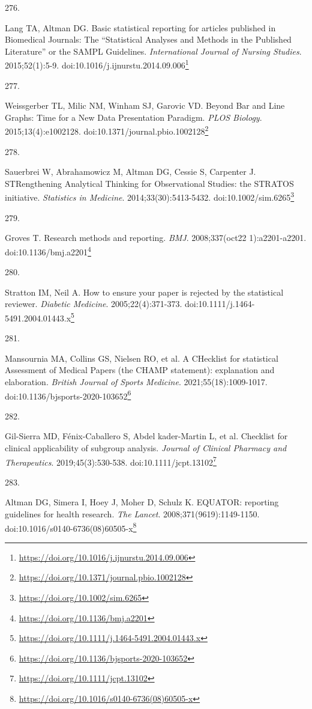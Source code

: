 \documentclass[
  a4paper,
]{book}
\newlength{\cslhangindent}
\newlength{\csllabelwidth}
\newlength{\cslentryspacingunit} %
\newenvironment{CSLReferences}[2] %
 {%
  \setlength{\parindent}{0pt}
  \ifodd #1
  \let\oldpar\par
  \def\par{\hangindent=\cslhangindent\oldpar}
  \fi
  \setlength{\parskip}{#2\cslentryspacingunit}
 }%
 {}
\newcommand{\CSLLeftMargin}[1]{\parbox[t]{\csllabelwidth}{#1}}
\newcommand{\CSLRightInline}[1]{\parbox[t]{\linewidth - \csllabelwidth}{#1}\break}
\renewcommand{\href}[2]{#2\footnote{\url{#1}}}
\begin{document}
\begin{CSLReferences}{0}{0}
\leavevmode{}%
\CSLLeftMargin{276. }%
\CSLRightInline{Lang TA, Altman DG. Basic statistical reporting for articles published in Biomedical Journals: The {``}Statistical Analyses and Methods in the Published Literature{''} or the SAMPL Guidelines. \emph{International Journal of Nursing Studies}. 2015;52(1):5-9. doi:\href{https://doi.org/10.1016/j.ijnurstu.2014.09.006}{10.1016/j.ijnurstu.2014.09.006}}

\leavevmode{}%
\CSLLeftMargin{277. }%
\CSLRightInline{Weissgerber TL, Milic NM, Winham SJ, Garovic VD. Beyond Bar and Line Graphs: Time for a New Data Presentation Paradigm. \emph{PLOS Biology}. 2015;13(4):e1002128. doi:\href{https://doi.org/10.1371/journal.pbio.1002128}{10.1371/journal.pbio.1002128}}

\leavevmode{}%
\CSLLeftMargin{278. }%
\CSLRightInline{Sauerbrei W, Abrahamowicz M, Altman DG, Cessie S, Carpenter J. STRengthening Analytical Thinking for Observational Studies: the STRATOS initiative. \emph{Statistics in Medicine}. 2014;33(30):5413-5432. doi:\href{https://doi.org/10.1002/sim.6265}{10.1002/sim.6265}}

\leavevmode{}%
\CSLLeftMargin{279. }%
\CSLRightInline{Groves T. Research methods and reporting. \emph{BMJ}. 2008;337(oct22 1):a2201-a2201. doi:\href{https://doi.org/10.1136/bmj.a2201}{10.1136/bmj.a2201}}

\leavevmode{}%
\CSLLeftMargin{280. }%
\CSLRightInline{Stratton IM, Neil A. How to ensure your paper is rejected by the statistical reviewer. \emph{Diabetic Medicine}. 2005;22(4):371-373. doi:\href{https://doi.org/10.1111/j.1464-5491.2004.01443.x}{10.1111/j.1464-5491.2004.01443.x}}

\leavevmode{}%
\CSLLeftMargin{281. }%
\CSLRightInline{Mansournia MA, Collins GS, Nielsen RO, et al. A CHecklist for statistical Assessment of Medical Papers (the CHAMP statement): explanation and elaboration. \emph{British Journal of Sports Medicine}. 2021;55(18):1009-1017. doi:\href{https://doi.org/10.1136/bjsports-2020-103652}{10.1136/bjsports-2020-103652}}

\leavevmode{}%
\CSLLeftMargin{282. }%
\CSLRightInline{Gil-Sierra MD, Fénix-Caballero S, Abdel kader-Martin L, et al. Checklist for clinical applicability of subgroup analysis. \emph{Journal of Clinical Pharmacy and Therapeutics}. 2019;45(3):530-538. doi:\href{https://doi.org/10.1111/jcpt.13102}{10.1111/jcpt.13102}}

\leavevmode{}%
\CSLLeftMargin{283. }%
\CSLRightInline{Altman DG, Simera I, Hoey J, Moher D, Schulz K. EQUATOR: reporting guidelines for health research. \emph{The Lancet}. 2008;371(9619):1149-1150. doi:\href{https://doi.org/10.1016/s0140-6736(08)60505-x}{10.1016/s0140-6736(08)60505-x}}

\end{CSLReferences}


\end{document}
